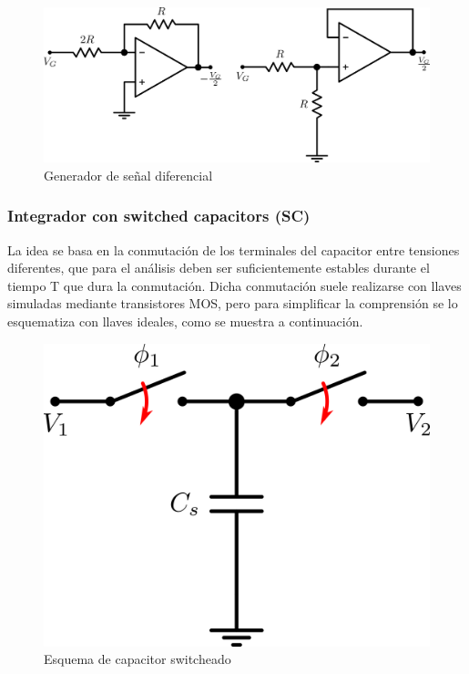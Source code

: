 \documentclass[assd_tp3_main.tex]{subfiles}
\begin{document}
\begin{figure}[!ht]
\begin{centering}
\includegraphics[scale=0.5]{images/ej5/diferenciador.png}
\par\end{centering}
\caption{Generador de señal diferencial}
\end{figure}

\subsubsection{Integrador con switched capacitors (SC)}

La idea se basa en la conmutación de los terminales del capacitor entre tensiones diferentes, que para el análisis deben ser suficientemente estables durante el tiempo T que dura la conmutación. Dicha conmutación suele realizarse con llaves simuladas mediante transistores MOS, pero para simplificar la comprensión se lo esquematiza con llaves ideales, como se muestra a continuación.

\begin{figure}[!ht]
\begin{centering}
\includegraphics[scale=0.5]{images/ej5/SCBasico.png}
\par\end{centering}
\caption{Esquema de capacitor switcheado}
\end{figure}
\end{document}
